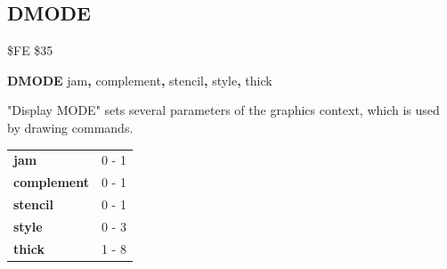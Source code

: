 \subsection{DMODE}
\begin{description}[leftmargin=2cm,style=nextline]
\item [Token:] \$FE \$35
\item [Format:] {\bf DMODE} jam{\bf,} complement{\bf,} 
		stencil{\bf,} style{\bf,} thick
\item [Usage:]
   "Display MODE" sets several parameters of the graphics context, which is used by drawing commands.

\begin{center}
\begin{tabular}{|l|l|}
\hline
   {\bf jam}        &  0 - 1 \\
   {\bf complement} &  0 - 1 \\
   {\bf stencil}    &  0 - 1 \\
   {\bf style}      &  0 - 3 \\
   {\bf thick}      &  1 - 8 \\
\hline
\end{tabular}
\end{center}
\end{description}


\newpage
